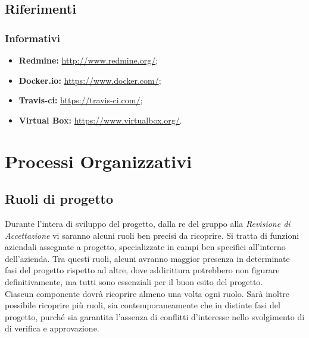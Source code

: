 \documentclass{scalatekids-article}
\begin{document}
\subsection{Riferimenti}
\subsubsection{Informativi}
\begin{itemize}
  \item \textbf{Redmine:} \url{http://www.redmine.org/};
  \item \textbf{Docker.io:} \url{https://www.docker.com/};
  \item \textbf{Travis-ci:} \url{https://travis-ci.com/};
  \item \textbf{Virtual Box:} \url{https://www.virtualbox.org/}.
\end{itemize}
\section{Processi Organizzativi}
\subsection{Ruoli di progetto}
Durante l'intera  di sviluppo del progetto, dalla re del gruppo alla
\textit{Revisione di Accettazione} vi saranno alcuni ruoli ben precisi da ricoprire. Si
tratta di funzioni aziendali assegnate a progetto, specializzate in campi ben
specifici all'interno dell'azienda. Tra questi ruoli, alcuni avranno maggior
presenza in determinate fasi del progetto rispetto ad altre, dove addirittura
potrebbero non figurare definitivamente, ma tutti sono essenziali per il buon
esito del progetto.\\ Ciascun componente dovrà ricoprire almeno una volta ogni
ruolo. Sarà inoltre possibile ricoprire più ruoli, sia contemporaneamente che in
distinte fasi del progetto, purché sia garantita l'assenza di conflitti
d'interesse nello svolgimento di  di verifica e approvazione.
\end{document}
